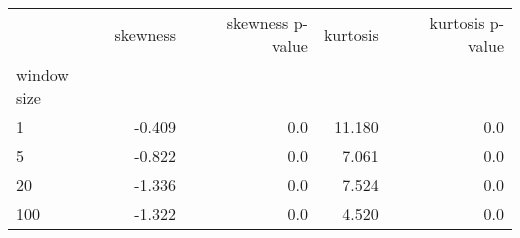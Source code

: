 \begin{tabular}{lrrrr}
\toprule
{} &  skewness &  skewness p-value &  kurtosis &  kurtosis p-value \\
window size &           &                   &           &                   \\
\midrule
1           &    -0.409 &               0.0 &    11.180 &               0.0 \\
5           &    -0.822 &               0.0 &     7.061 &               0.0 \\
20          &    -1.336 &               0.0 &     7.524 &               0.0 \\
100         &    -1.322 &               0.0 &     4.520 &               0.0 \\
\bottomrule
\end{tabular}
